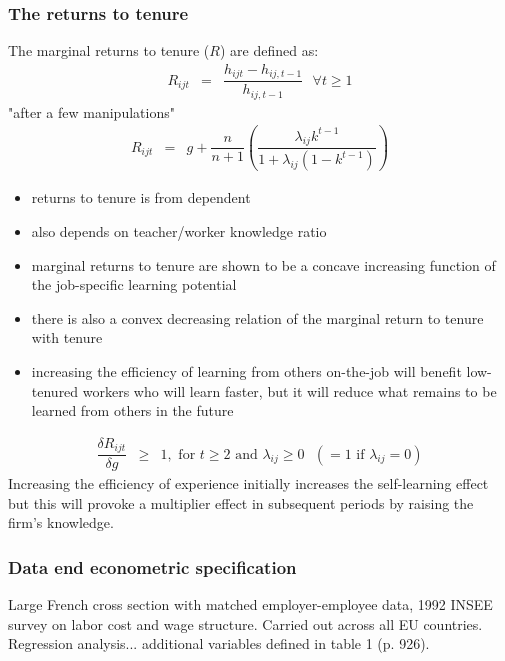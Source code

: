 \documentclass[12pt,a4paper]{article}
\begin{document}
  \subsubsection{The returns to tenure} %
  \label{ssub:The returns to tenure}
  The marginal returns to tenure ($R$) are defined as:
  \begin{eqnarray*}
    R_{ijt} &=& \dfrac{h_{ijt}- h_{ij,t-1}}{h_{ij,t-1}} \mbox{  } \forall t \geq 1
  \end{eqnarray*}
  "after a few manipulations"
  \begin{eqnarray}
    R_{ijt} &=& g + \dfrac{n}{n+1} \left( \dfrac{\lambda_{ij} k^{t-1}}{1+\lambda_{ij}(1-k^{t-1})} \right)
  \end{eqnarray}
  \begin{itemize}
    \item returns to tenure is from dependent
    \item also depends on teacher/worker knowledge ratio
    \item marginal returns to tenure are shown to be a concave increasing function of the
      job-specific learning potential
    \item there is also a convex decreasing relation of the marginal return to tenure with tenure
    \item increasing the efficiency of learning from others on-the-job will benefit low-tenured
      workers who will learn faster, but it will reduce what remains to be learned from others in
      the future
  \end{itemize}
  \begin{eqnarray*}
    \dfrac{\delta R_{ijt}}{\delta g} & \geq & 1, \mbox{  for  } t \geq 2 \mbox{  and  }
    \lambda_{ij} \geq 0 \mbox{  } (=1 \mbox{  if  } \lambda_{ij}=0)
  \end{eqnarray*}
  Increasing the efficiency of experience initially increases the self-learning effect but this will
  provoke a multiplier effect in subsequent periods by raising the firm's knowledge.

  \subsubsection{Data end econometric specification} %
  \label{ssub:Data end econometric specification}
  Large French cross section with matched employer-employee data, 1992 INSEE survey on labor cost
  and wage structure. Carried out across all EU countries. Regression analysis... additional
  variables defined in table 1 (p. 926).
\end{document}
